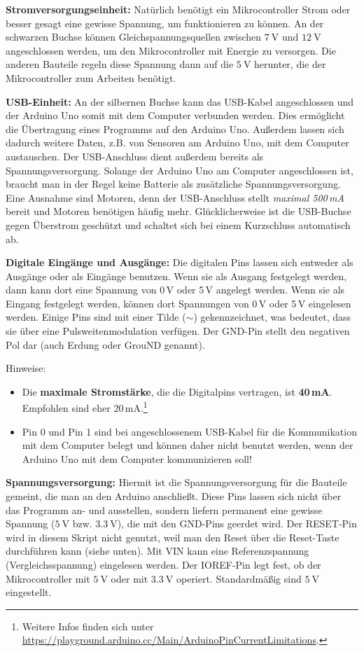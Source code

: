 \textbf{Stromversorgungseinheit:} Natürlich benötigt ein Mikrocontroller Strom oder besser gesagt eine gewisse Spannung, um funktionieren zu können. An der schwarzen Buchse können Gleichspannungsquellen zwischen $\SI{7}{\volt}$ und $\SI{12}{\volt}$ angeschlossen werden, um den Mikrocontroller mit Energie zu versorgen. Die anderen Bauteile regeln diese Spannung dann auf die $\SI{5}{\volt}$ herunter, die der Mikrocontroller zum Arbeiten benötigt.

\textbf{USB-Einheit:} An der silbernen Buchse kann das USB-Kabel angeschlossen und der Arduino Uno somit mit dem Computer verbunden werden. Dies ermöglicht die Übertragung eines Programms auf den Arduino Uno. Außerdem lassen sich dadurch weitere Daten, z.B. von Sensoren am Arduino Uno, mit dem Computer austauschen. Der USB-Anschluss dient außerdem bereits als Spannungsversorgung. Solange der Arduino Uno am Computer angeschlossen ist, braucht man in der Regel keine Batterie als zusätzliche Spannungsversorgung. Eine Ausnahme sind Motoren, denn der USB-Anschluss stellt \emph{maximal 500\,mA} bereit und Motoren benötigen häufig mehr. Glücklicherweise ist die USB-Buchse gegen Überstrom geschützt und schaltet sich bei einem Kurzschluss automatisch ab.

\textbf{Digitale Eingänge und Ausgänge:} Die digitalen Pins lassen sich entweder als Ausgänge oder als Eingänge benutzen. Wenn sie als Ausgang festgelegt werden, dann kann dort eine Spannung von 0\,V oder 5\,V angelegt werden. Wenn sie als Eingang festgelegt werden, können dort Spannungen von 0\,V oder 5\,V eingelesen werden. Einige Pins sind mit einer Tilde ($\sim$) gekennzeichnet, was bedeutet, dass sie über eine Pulsweitenmodulation verfügen. Der GND-Pin stellt den negativen Pol dar (auch Erdung oder GrouND genannt).

Hinweise: 
\begin{itemize}
	\item Die \textbf{maximale Stromstärke}, die die Digitalpins vertragen, ist \textbf{40\,mA}. Empfohlen sind eher 20\,mA.\footnote{Weitere Infos finden sich unter \url{https://playground.arduino.cc/Main/ArduinoPinCurrentLimitations}.}
	\item Pin 0 und Pin 1 sind bei angeschlossenem USB-Kabel für die Kommunikation mit dem Computer belegt und können daher nicht benutzt werden, wenn der Arduino Uno mit dem Computer kommunizieren soll!
\end{itemize}

\textbf{Spannungsversorgung:} Hiermit ist die Spannungsversorgung für die Bauteile gemeint, die man an den Arduino anschließt. Diese Pins lassen sich nicht über das Programm an- und ausstellen, sondern liefern permanent eine gewisse Spannung ($\SI{5}{\volt}$ bzw. $\SI{3,3}{\volt}$), die mit den GND-Pins geerdet wird. Der RESET-Pin wird in diesem Skript nicht genutzt, weil man den Reset über die Reset-Taste durchführen kann (siehe unten). Mit VIN kann eine Referenzspannung (Vergleichsspannung) eingelesen werden. Der IOREF-Pin legt fest, ob der Mikrocontroller mit $\SI{5}{\volt}$ oder mit $\SI{3,3}{\volt}$ operiert. Standardmäßig sind $\SI{5}{\volt}$ eingestellt.

